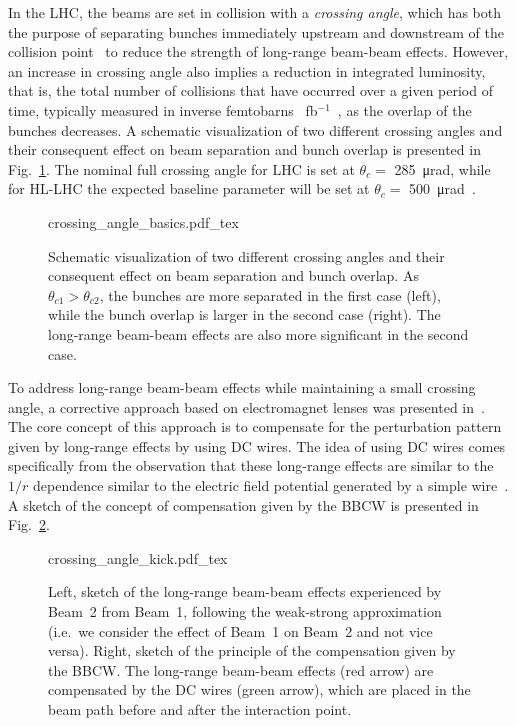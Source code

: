 In the LHC, the beams are set in collision with a \textit{crossing angle}, which has both the purpose of separating bunches immediately upstream and downstream of the collision point~\cite{Arduini_2016} to reduce the strength of long-range beam-beam effects. However, an increase in crossing angle also implies a reduction in integrated luminosity, that is, the total number of collisions that have occurred over a given period of time, typically measured in inverse femtobarns \SI{}{fb}$^{-1}$~\cite{Herr:941318}, as the overlap of the bunches decreases. A schematic visualization of two different crossing angles and their consequent effect on beam separation and bunch overlap is presented in Fig.~\ref{fig:crossing-angles}. The nominal full crossing angle for LHC is set at $\theta_c =$ \SI{285}{\micro\radian}, while for HL-LHC the expected baseline parameter will be set at $\theta_c =$ \SI{500}{\micro\radian}~\cite{BejarAlonso:2749422}. 

\begin{figure}[hpt]
    \centering
    \def\svgwidth{1.0\textwidth}
    {crossing_angle_basics.pdf_tex}
    \caption{Schematic visualization of two different crossing angles and their consequent effect on beam separation and bunch overlap. As $\theta_{c1} > \theta_{c2}$, the bunches are more separated in the first case (left), while the bunch overlap is larger in the second case (right). The long-range beam-beam effects are also more significant in the second case.}
    \label{fig:crossing-angles}
\end{figure}

To address long-range beam-beam effects while maintaining a small crossing angle, a corrective approach based on electromagnet lenses was presented in~\cite{Koutchouk:692058}. The core concept of this approach is to compensate for the perturbation pattern given by long-range effects by using DC wires. The idea of using DC wires comes specifically from the observation that these long-range effects are similar to the $1/r$ dependence similar to the electric field potential generated by a simple wire~\cite{PhysRevSTAB.5.074001}. A sketch of the concept of compensation given by the BBCW is presented in Fig.~\ref{fig:wire-baseline}.

\begin{figure}[hpt]
    \centering
    \def\svgwidth{1.0\textwidth}
    {crossing_angle_kick.pdf_tex}
    \caption{Left, sketch of the long-range beam-beam effects experienced by Beam~2 from Beam~1, following the weak-strong approximation (i.e.\ we consider the effect of Beam~1 on Beam~2 and not vice versa). Right, sketch of the principle of the compensation given by the BBCW. The long-range beam-beam effects (red arrow) are compensated by the DC wires (green arrow), which are placed in the beam path before and after the interaction point.}
    \label{fig:wire-baseline}
\end{figure}


